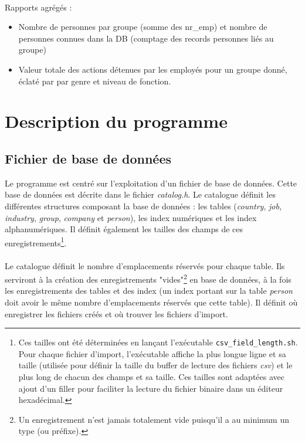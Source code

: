\documentclass{article}
\begin{document}
    \paragraph{}
    Rapports agrégés :
    \begin{itemize}[label=$\bullet$]
        \item Nombre de personnes par groupe (somme des nr\_emp) et nombre de personnes connues dans la DB (comptage des records personnes liés au groupe)
        \item Valeur totale des actions détenues par les employés pour un groupe donné, éclaté par par genre et niveau
        de fonction.
    \end{itemize}



    \newpage
    \section{Description du programme}

    \subsection{Fichier de base de données}
    Le programme est centré sur l'exploitation d'un fichier de base de données. Cette base de données est décrite dans le fichier \emph{catalog.h}. Le catalogue définit les différentes structures composant la base de données : les tables (\emph{country}, \emph{job}, \emph{industry}, \emph{group}, \emph{company} et \emph{person}), les index numériques et les index alphanumériques. Il définit également les tailles des champs de ces enregistrements\footnote{Ces tailles ont été déterminées en lançant l'exécutable \texttt{csv\_field\_length.sh}. Pour chaque fichier d'import, l'exécutable affiche la plus longue ligne et sa taille (utilisée pour définir la taille du buffer de lecture des fichiers \emph{csv}) et le plus long de chacun des champs et sa taille. Ces tailles sont adaptées avec ajout d'un filler pour faciliter la lecture du fichier binaire dans un éditeur hexadécimal.}.

    \paragraph{}
    Le catalogue définit le nombre d'emplacements réservés pour chaque table. Ils serviront à la création des enregistrements "vides"\footnote{Un enregistrement n'est jamais totalement vide puisqu'il a au minimum un type (ou préfixe).} en base de données, à la fois les enregistrements des tables et des index (un index portant sur la table \emph{person} doit avoir le même nombre d'emplacements réservés que cette table). Il définit où enregistrer les fichiers créés et où trouver les fichiers d'import.
\end{document}
